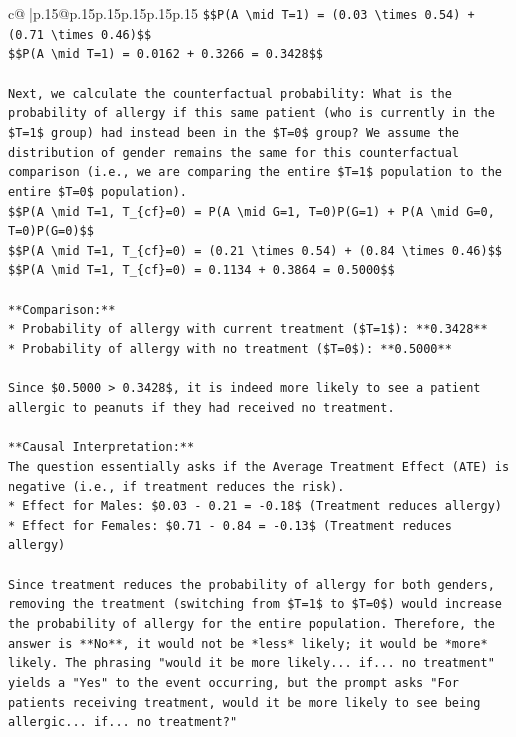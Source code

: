 \documentclass{article}
\begin{document}
{\begin{supertabular}{c@{$\;$}|p{.15\linewidth}@{}p{.15\linewidth}p{.15\linewidth}p{.15\linewidth}p{.15\linewidth}p{.15\linewidth}}
{{{\texttt{\$\$P(A \textbackslash{}mid T=1) = (0.03 \textbackslash{}times 0.54) + (0.71 \textbackslash{}times 0.46)\$\$} \\
\texttt{\$\$P(A \textbackslash{}mid T=1) = 0.0162 + 0.3266 = 0.3428\$\$} \\
\\ 
\texttt{Next, we calculate the counterfactual probability: What is the probability of allergy if this same patient (who is currently in the \$T=1\$ group) had instead been in the \$T=0\$ group? We assume the distribution of gender remains the same for this counterfactual comparison (i.e., we are comparing the entire \$T=1\$ population to the entire \$T=0\$ population).} \\
\texttt{\$\$P(A \textbackslash{}mid T=1, T\_\{cf\}=0) = P(A \textbackslash{}mid G=1, T=0)P(G=1) + P(A \textbackslash{}mid G=0, T=0)P(G=0)\$\$} \\
\texttt{\$\$P(A \textbackslash{}mid T=1, T\_\{cf\}=0) = (0.21 \textbackslash{}times 0.54) + (0.84 \textbackslash{}times 0.46)\$\$} \\
\texttt{\$\$P(A \textbackslash{}mid T=1, T\_\{cf\}=0) = 0.1134 + 0.3864 = 0.5000\$\$} \\
\\ 
\texttt{**Comparison:**} \\
\texttt{*   Probability of allergy with current treatment (\$T=1\$): **0.3428**} \\
\texttt{*   Probability of allergy with no treatment (\$T=0\$): **0.5000**} \\
\\ 
\texttt{Since \$0.5000 > 0.3428\$, it is indeed more likely to see a patient allergic to peanuts if they had received no treatment.} \\
\\ 
\texttt{**Causal Interpretation:**} \\
\texttt{The question essentially asks if the Average Treatment Effect (ATE) is negative (i.e., if treatment reduces the risk).} \\
\texttt{*   Effect for Males: \$0.03 {-} 0.21 = {-}0.18\$ (Treatment reduces allergy)} \\
\texttt{*   Effect for Females: \$0.71 {-} 0.84 = {-}0.13\$ (Treatment reduces allergy)} \\
\\ 
\texttt{Since treatment reduces the probability of allergy for both genders, removing the treatment (switching from \$T=1\$ to \$T=0\$) would increase the probability of allergy for the entire population. Therefore, the answer is **No**, it would not be *less* likely; it would be *more* likely. The phrasing "would it be more likely... if... no treatment" yields a "Yes" to the event occurring, but the prompt asks "For patients receiving treatment, would it be more likely to see being allergic... if... no treatment?"} \\
}}}
\end{supertabular}}
\end{document}
